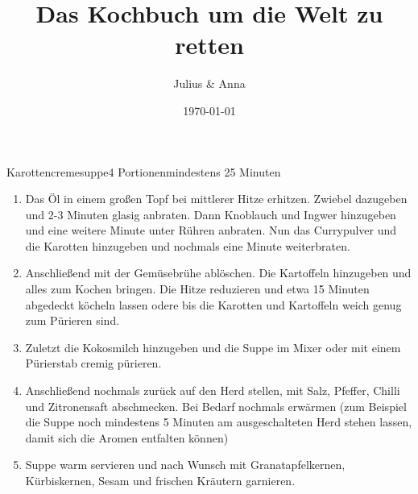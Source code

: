 \documentclass{article}
\title{Das Kochbuch um die Welt zu retten}
\author{Julius \& Anna}
\date{\today}
\begin{document}
\maketitle
\begin{recipe}{Karottencremesuppe}{4 Portionen}{mindestens 25 Minuten}
\begin{enumerate}
  \item Das Öl in einem großen Topf bei mittlerer Hitze erhitzen. Zwiebel dazugeben und 2-3 Minuten glasig anbraten. Dann Knoblauch und Ingwer hinzugeben und eine weitere Minute unter Rühren anbraten. Nun das Currypulver und die Karotten hinzugeben und nochmals eine Minute weiterbraten.
  \item Anschließend mit der Gemüsebrühe ablöschen. Die Kartoffeln hinzugeben und alles zum Kochen bringen. Die Hitze reduzieren und etwa 15 Minuten abgedeckt köcheln lassen odere bis die Karotten und Kartoffeln weich genug zum Pürieren sind.
  \item Zuletzt die Kokosmilch hinzugeben und die Suppe im Mixer oder mit einem Pürierstab cremig pürieren.
  \item Anschließend nochmals zurück auf den Herd stellen, mit Salz, Pfeffer, Chilli und Zitronensaft abschmecken. Bei Bedarf nochmals erwärmen (zum Beispiel die Suppe noch mindestens 5 Minuten am ausgeschalteten Herd stehen lassen, damit sich die Aromen entfalten können)
  \item Suppe warm servieren und nach Wunsch mit Granatapfelkernen, Kürbiskernen, Sesam und frischen Kräutern garnieren.

\end{enumerate}
\end{recipe}
\end{document}
